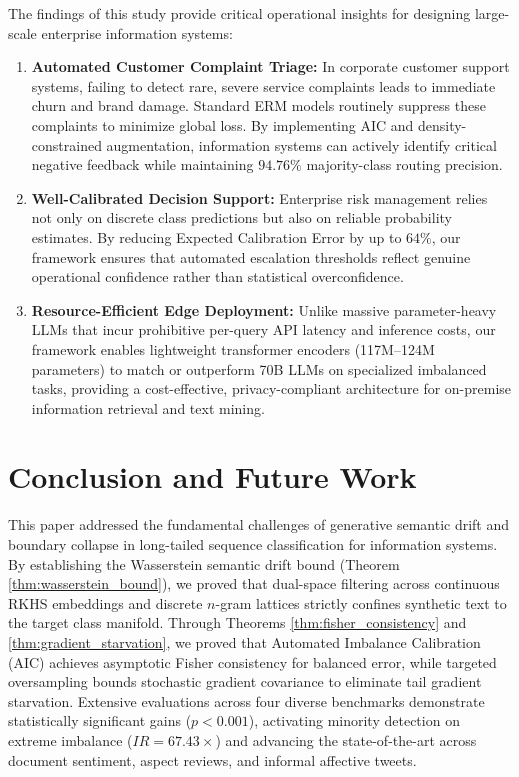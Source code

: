 \documentclass[final,5p,times,twocolumn]{elsarticle}
\begin{document}
The findings of this study provide critical operational insights for designing large-scale enterprise information systems:
\begin{enumerate}
    \item \textbf{Automated Customer Complaint Triage:} In corporate customer support systems, failing to detect rare, severe service complaints leads to immediate churn and brand damage. Standard ERM models routinely suppress these complaints to minimize global loss. By implementing AIC and density-constrained augmentation, information systems can actively identify critical negative feedback while maintaining $94.76\%$ majority-class routing precision.
    \item \textbf{Well-Calibrated Decision Support:} Enterprise risk management relies not only on discrete class predictions but also on reliable probability estimates. By reducing Expected Calibration Error by up to $64\%$, our framework ensures that automated escalation thresholds reflect genuine operational confidence rather than statistical overconfidence.
    \item \textbf{Resource-Efficient Edge Deployment:} Unlike massive parameter-heavy LLMs that incur prohibitive per-query API latency and inference costs, our framework enables lightweight transformer encoders (117M--124M parameters) to match or outperform 70B LLMs on specialized imbalanced tasks, providing a cost-effective, privacy-compliant architecture for on-premise information retrieval and text mining.
\end{enumerate}

\section{Conclusion and Future Work}
\label{sec:conclusion}

This paper addressed the fundamental challenges of generative semantic drift and boundary collapse in long-tailed sequence classification for information systems. By establishing the Wasserstein semantic drift bound (Theorem \ref{thm:wasserstein_bound}), we proved that dual-space filtering across continuous RKHS embeddings and discrete $n$-gram lattices strictly confines synthetic text to the target class manifold. Through Theorems \ref{thm:fisher_consistency} and \ref{thm:gradient_starvation}, we proved that Automated Imbalance Calibration (AIC) achieves asymptotic Fisher consistency for balanced error, while targeted oversampling bounds stochastic gradient covariance to eliminate tail gradient starvation. Extensive evaluations across four diverse benchmarks demonstrate statistically significant gains ($p < 0.001$), activating minority detection on extreme imbalance ($IR=67.43\times$) and advancing the state-of-the-art across document sentiment, aspect reviews, and informal affective tweets.
\end{document}
